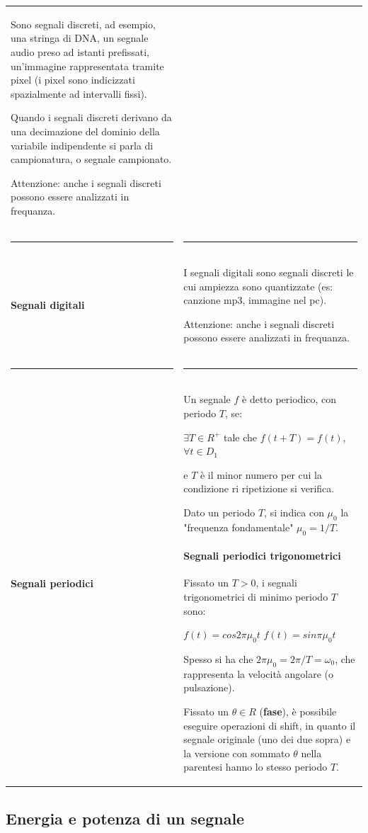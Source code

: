 \documentclass[a4paper, 10pt]{report}
\begin{document}
\begin{longtable}{| p{} | p{} |}
Sono segnali discreti, ad esempio, una stringa di DNA, un segnale audio preso ad istanti prefissati, un'immagine rappresentata tramite pixel (i pixel sono indicizzati spazialmente ad intervalli fissi).

Quando i segnali discreti derivano da una
decimazione del dominio della variabile
indipendente si parla di campionatura, o
segnale campionato.

Attenzione: anche i segnali discreti possono essere analizzati in frequanza.
\\
\hrule & \hrule
\\
\textbf{Segnali digitali} & I segnali digitali sono segnali discreti le cui ampiezza sono quantizzate (es: canzione mp3, immagine nel pc).

Attenzione: anche i segnali discreti possono essere analizzati in frequanza.
\\
\hrule & \hrule
\\
\textbf{Segnali periodici} & Un segnale $f$ è detto periodico, con periodo $T$, se:
\begin{center}
$ \exists T \in R^+$ tale che $f(t + T) = f(t)$,  $\forall t \in D_1$
\end{center}

\noindent e $T$ è il minor numero per cui la condizione ri ripetizione si verifica.

Dato un periodo $T$, si indica con $\mu_0$ la "frequenza fondamentale" $\mu_0 = 1/T$.

\paragraph*{Segnali periodici trigonometrici} Fissato un $T>0$, i segnali trigonometrici di minimo periodo $T$ sono:
\begin{center}
$f(t) = cos2\pi \mu_0 t$ \hspace{1cm} $f(t) = sin\pi \mu_0 t$
\end{center}

\noindent Spesso si ha che $2\pi \mu_0 = 2\pi / T = \omega_0$, che rappresenta la velocità angolare (o pulsazione). 

Fissato un $\theta \in R$ (\textbf{fase}), è possibile eseguire operazioni di shift, in quanto il segnale originale (uno dei due sopra) e la versione con sommato $\theta$ nella parentesi hanno lo stesso periodo $T$.
\end{longtable}

\subsection*{Energia e potenza di un segnale}
\end{document}
